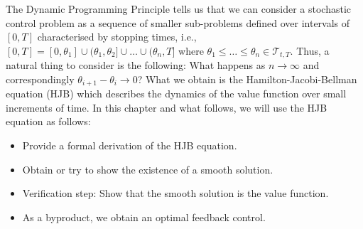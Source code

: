 The Dynamic Programming Principle tells us that we can consider a stochastic control
problem as a sequence of smaller sub-problems defined over intervals of $[0,T]$
characterised by stopping times, i.e., $[0,T]=[0,\theta_1]\cup(\theta_1,\theta_2]\cup\dots\cup(\theta_{n},T]$
where $\theta_1\leq\dots\leq\theta_n\in\mathcal{T}_{t,T}.$ Thus, a natural thing to consider
is the following: What happens as $n\rightarrow\infty$ and correspondingly $\theta_{i+1}-\theta_i\rightarrow0$?
What we obtain is the Hamilton-Jacobi-Bellman equation (HJB) which describes the 
dynamics of the value function over small increments of time. In this chapter and what 
follows, we will use the HJB equation as follows:
\begin{itemize}
    \item Provide a formal derivation of the HJB equation.
    \item Obtain or try to show the existence of a smooth solution.
    \item Verification step: Show that the smooth solution is the value function.
    \item As a byproduct, we obtain an optimal feedback control.
\end{itemize}

